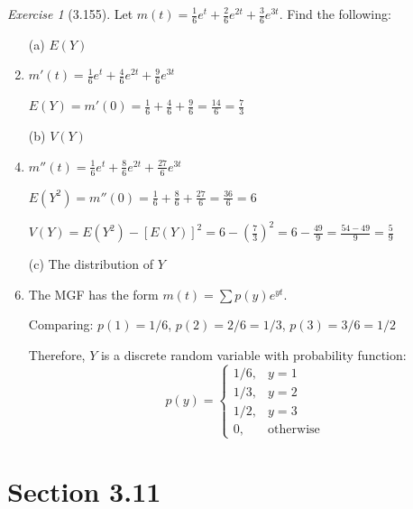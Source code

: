 \documentclass[12pt]{amsart}
\makeatletter
\theoremstyle{remark}
\newtheorem*{exercise}{Exercise}%
\renewenvironment{proof}[1][\proofname]{\par\doublespacing
  \pushQED{\qed}%
  \normalfont \topsep6\p@\@plus6\p@\relax
  \list{}{%
    \settowidth{\leftmargin}{\itshape\proofname:\hskip\labelsep}%
    \setlength{\labelwidth}{0pt}%
    \setlength{\itemindent}{-\leftmargin}%
  }%
  \item[\hskip\labelsep\itshape#1\@addpunct{:}]\ignorespaces
}{%
  \popQED\endlist\@endpefalse
  \singlespacing
}
\theoremstyle{mycomment}
\makeatother
\begin{document}
\begin{exercise}[3.155]
Let $m(t) = \frac{1}{6}e^t + \frac{2}{6}e^{2t} + \frac{3}{6}e^{3t}$. Find the following:

\begin{enumerate}
    \item[(a)] $E(Y)$
\begin{proof}[Solution]
 $m'(t) = \frac{1}{6}e^t + \frac{4}{6}e^{2t} + \frac{9}{6}e^{3t}$
	
	$E(Y) = m'(0) = \frac{1}{6} + \frac{4}{6} + \frac{9}{6} = \frac{14}{6} = \frac{7}{3}$
\end{proof}
    \item[(b)] $V(Y)$
\begin{proof}[Solution]
 $m''(t) = \frac{1}{6}e^t + \frac{8}{6}e^{2t} + \frac{27}{6}e^{3t}$
	
	$E(Y^2) = m''(0) = \frac{1}{6} + \frac{8}{6} + \frac{27}{6} = \frac{36}{6} = 6$
	
	$V(Y) = E(Y^2) - [E(Y)]^2 = 6 - \left(\frac{7}{3}\right)^2 = 6 - \frac{49}{9} = \frac{54 - 49}{9} = \frac{5}{9}$
\end{proof}
    \item[(c)] The distribution of $Y$
\begin{proof}[Solution]
 The MGF has the form $m(t) = \sum p(y) e^{yt}$.
	
	Comparing: $p(1) = 1/6$, $p(2) = 2/6 = 1/3$, $p(3) = 3/6 = 1/2$
	
	Therefore, $Y$ is a discrete random variable with probability function:
	$$p(y) = \begin{cases}
	1/6, & y = 1 \\
	1/3, & y = 2 \\
	1/2, & y = 3 \\
	0, & \text{otherwise}
	\end{cases}$$
\end{proof}
\end{enumerate} 
\end{exercise}

\section*{Section 3.11}
\end{document}
